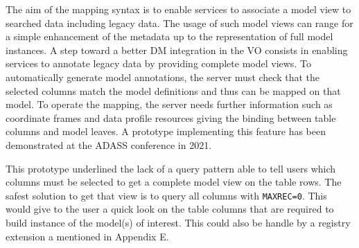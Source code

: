 The aim of the mapping syntax is to enable services to associate a model view to searched data including legacy data.
The usage of such model views can range for a simple enhancement of the metadata up to the representation of full model instances.
A step toward a better DM integration in the VO consists in enabling services to annotate
legacy data by providing complete model
views. 
To automatically generate model annotations, the server must check that the selected columns 
match the model definitions and thus can be
mapped on that model. To operate the mapping, the server needs further information
such as coordinate frames and data profile resources giving the binding between table
columns and model leaves. A prototype \citep{2201.01732} implementing this feature
has been demonstrated at the ADASS conference in 2021.

This prototype underlined the lack of a query pattern able to tell users which columns must be selected to get a 
complete model view on the table rows. The safest solution to get that view is to query all columns with \texttt{MAXREC=0}.
This would give to the user a quick look on the table columns that are required to build instance of the model(s) of interest.
This could also be handle by a registry extension a mentioned in Appendix E.

